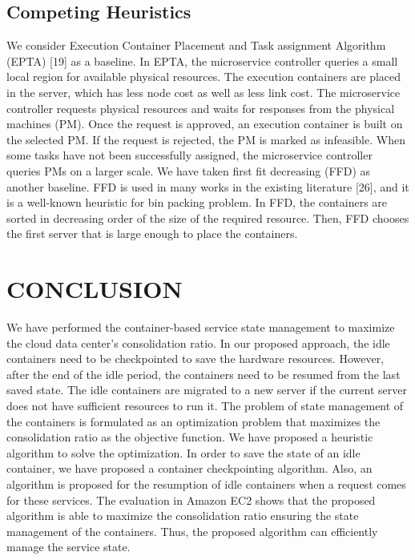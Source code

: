 \documentclass[conference]{IEEEtran}
\begin{document}
\subsection{Competing Heuristics}
We consider Execution Container Placement and Task assignment Algorithm (EPTA) [19] as a baseline. In EPTA,
the microservice controller queries a small local region for
available physical resources. The execution containers are
placed in the server, which has less node cost as well as
less link cost. The microservice controller requests physical
resources and waits for responses from the physical machines
(PM). Once the request is approved, an execution container
is built on the selected PM. If the request is rejected, the
PM is marked as infeasible. When some tasks have not been
successfully assigned, the microservice controller queries PMs
on a larger scale. We have taken first fit decreasing (FFD) as
another baseline. FFD is used in many works in the existing
literature [26], and it is a well-known heuristic for bin packing
problem. In FFD, the containers are sorted in decreasing order
of the size of the required resource. Then, FFD chooses the
first server that is large enough to place the containers.

\section{CONCLUSION}
We have performed the container-based service state management to maximize the cloud data center’s consolidation ratio. In our proposed approach, the idle containers need to
be checkpointed to save the hardware resources. However,
after the end of the idle period, the containers need to be
resumed from the last saved state. The idle containers are
migrated to a new server if the current server does not have
sufficient resources to run it. The problem of state management
of the containers is formulated as an optimization problem that
maximizes the consolidation ratio as the objective function. We
have proposed a heuristic algorithm to solve the optimization.
In order to save the state of an idle container, we have proposed
a container checkpointing algorithm. Also, an algorithm is
proposed for the resumption of idle containers when a request
comes for these services. The evaluation in Amazon EC2
shows that the proposed algorithm is able to maximize the
consolidation ratio ensuring the state management of the containers. Thus, the proposed algorithm can efficiently manage
the service state.
\end{document}
